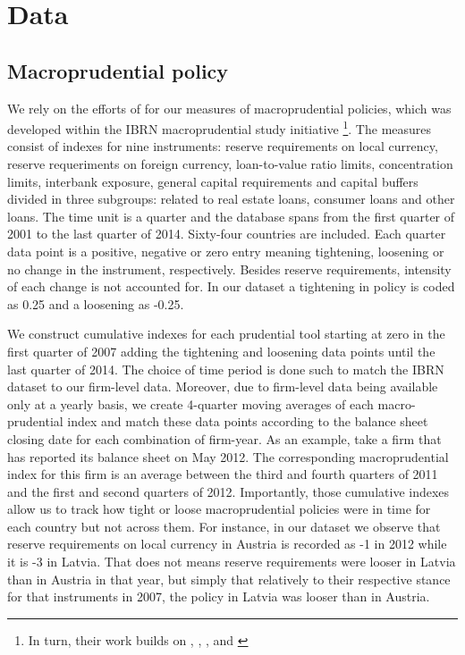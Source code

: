 \documentclass[12pt]{article}
\begin{document}
	\section{Data} \label{sec:data}	
	\subsection{Macroprudential policy} \label{subsec:MPI}
	
	We rely on the efforts of \cite*{cerutti2017changes} for our measures of macroprudential policies, which was developed within the IBRN macroprudential study initiative \footnote{In turn, their work builds on \cite{lim2011macroprudential}, \cite*{cerutti2015use}, \cite*{reinhardt2015regulatory}, \cite*{kuttner2016can} and \cite*{akinci2017effective}}. The measures consist of indexes for nine instruments: reserve requirements on local currency, reserve requeriments on foreign currency, loan-to-value ratio limits, concentration limits, interbank exposure, general capital requirements and capital buffers divided in three subgroups: related to real estate loans, consumer loans and other loans. The time unit is a quarter and the database spans from the first quarter of 2001 to the last quarter of 2014. Sixty-four countries are included. Each quarter data point is a positive, negative or zero entry meaning tightening, loosening or no change in the instrument, respectively. Besides reserve requirements, intensity of each change is not accounted for. In our dataset a tightening in policy is coded as 0.25 and a loosening as -0.25.

     We construct cumulative indexes for each prudential tool starting at zero in the first quarter of 2007 adding the tightening and loosening data points until the last quarter of 2014. The choice of time period is done such to match the IBRN dataset to our firm-level data. Moreover, due to firm-level data being available only at a yearly basis, we create 4-quarter moving averages of each macro-prudential index and match these data points according to the balance sheet closing date for each combination of firm-year. As an example, take a firm that has reported its balance sheet on May 2012. The corresponding macroprudential index for this firm is an average between the third and fourth quarters of 2011 and the first and second quarters of 2012. Importantly, those cumulative indexes allow us to track how tight or loose macroprudential policies were in time for each country but not across them. For instance, in our dataset we observe that reserve requirements on local currency in Austria is recorded as -1 in 2012 while it is -3 in Latvia. That does not means reserve requirements were looser in Latvia than in Austria in that year, but simply that relatively to their respective stance for that instruments in 2007, the policy in Latvia was looser than in Austria. 
	  
\end{document}
